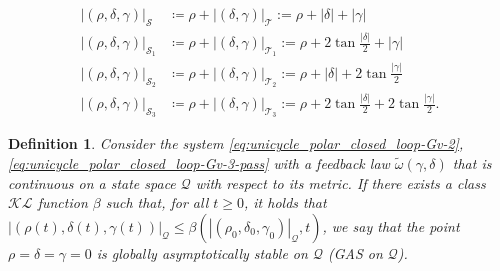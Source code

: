 \documentclass[letterpaper, 10 pt, conference]{ieeeconf}  %
\newtheorem{definition}{Definition}
\begin{document}
\begin{align*}
|(\rho,\delta,\gamma)|_{\mathcal{S}}   &\coloneqq \rho+|(\delta,\gamma)|_{\mathcal{T}} 
      :=  \rho + |\delta| + |\gamma|  %
      \\
|(\rho,\delta,\gamma)|_{\mathcal{S}_1} &\coloneqq \rho+|(\delta,\gamma)|_{\mathcal{T}_1} 
      := \rho+ 2\tan\!\frac{|\delta|}{2} + |\gamma|  %
      \\
|(\rho,\delta,\gamma)|_{\mathcal{S}_2} &\coloneqq \rho+|(\delta,\gamma)|_{\mathcal{T}_2} 
      := \rho+ |\delta| + 2\tan\!\frac{|\gamma|}{2}  %
      \\
|(\rho,\delta,\gamma)|_{\mathcal{S}_3} &\coloneqq \rho+|(\delta,\gamma)|_{\mathcal{T}_3} 
      := \rho+2\tan\!\frac{|\delta|}{2} + 2\tan\!\frac{|\gamma|}{2}. %
\end{align*}



\begin{definition}
\label{def-our-GAS}
Consider the system \eqref{eq:unicycle_polar_closed_loop-Gv-2}, \eqref{eq:unicycle_polar_closed_loop-Gv-3-pass} with a feedback law $\tilde\omega(\gamma,\delta)$ that is continuous on a state space $\mathcal{Q}$ with respect to its metric. 
If there exists a class $\mathcal{KL}$ function $\beta$ such that, for all $t\geq 0$, it holds that $|(\rho(t),\delta(t), \gamma(t))|_{\mathcal{Q}}\leq \beta\left(|(\rho_0,\delta_0, \gamma_0)|_{\mathcal{Q}},t\right)$, we say that the 
point $\rho=\delta = \gamma=0$ is {\em globally asymptotically stable on $\mathcal{Q}$} (GAS on $\mathcal{Q}$). 
\end{definition}
\end{document}
